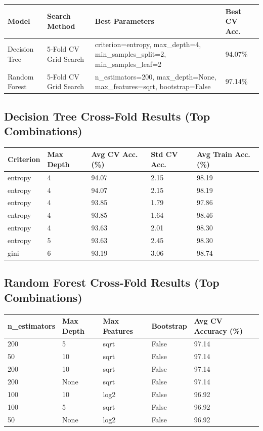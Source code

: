 \documentclass[12pt,a4paper]{article}
\begin{document}
\vspace{0.3cm}
\begin{tabular}{p{3cm}p{2.6cm}p{7cm}p{2cm}}
\toprule
Model & Search Method & Best Parameters & Best CV Acc. \\
\midrule
Decision Tree & 5-Fold CV Grid Search & criterion=entropy, max\_depth=4, min\_samples\_split=2,
min\_samples\_leaf=2 & 94.07\% \\
Random Forest & 5-Fold CV Grid Search & n\_estimators=200, max\_depth=None, max\_features=sqrt,
bootstrap=False & 97.14\% \\
\bottomrule
\end{tabular}

\subsection{Decision Tree Cross-Fold Results (Top Combinations)}
\begin{longtable}{p{2.3cm}p{2.3cm}p{3.3cm}p{3cm}p{3.3cm}}
\toprule
Criterion & Max Depth & Avg CV Acc. (\%) & Std CV Acc. & Avg Train Acc. (\%) \\
\midrule
\endhead
entropy & 4 & 94.07 & 2.15 & 98.19 \\
entropy & 4 & 94.07 & 2.15 & 98.19 \\
entropy & 4 & 93.85 & 1.79 & 97.86 \\
entropy & 4 & 93.85 & 1.64 & 98.46 \\
entropy & 4 & 93.63 & 2.01 & 98.30 \\
entropy & 5 & 93.63 & 2.45 & 98.30 \\
gini & 6 & 93.19 & 3.06 & 98.74 \\
\bottomrule
\end{longtable}

\subsection{Random Forest Cross-Fold Results (Top Combinations)}
\begin{longtable}{p{2.3cm}p{2.3cm}p{2.6cm}p{2.3cm}p{3.3cm}}
\toprule
n\_estimators & Max Depth & Max Features & Bootstrap & Avg CV Accuracy (\%) \\
\midrule
\endhead
200 & 5 & sqrt & False & 97.14 \\
50 & 10 & sqrt & False & 97.14 \\
200 & 10 & sqrt & False & 97.14 \\
200 & None & sqrt & False & 97.14 \\
100 & 10 & log2 & False & 96.92 \\
100 & 5 & sqrt & False & 96.92 \\
50 & None & log2 & False & 96.92 \\
\bottomrule
\end{longtable}
\end{document}
